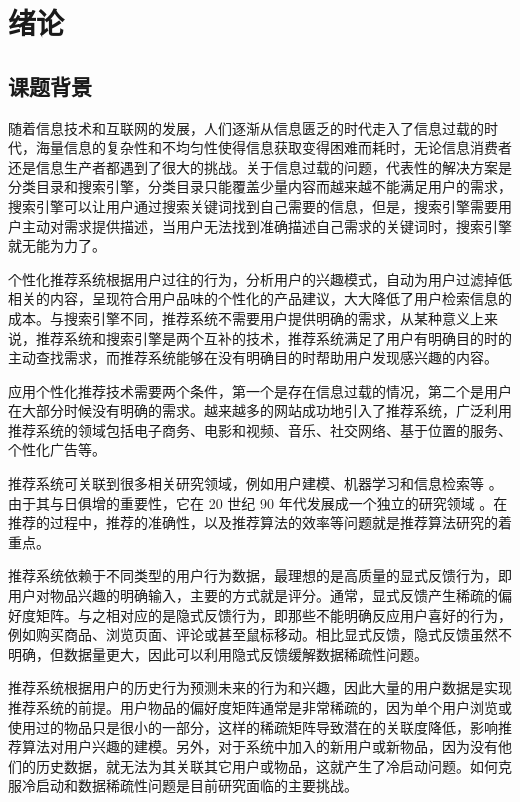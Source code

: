 \chapter{绪论}

\section{课题背景}

随着信息技术和互联网的发展，人们逐渐从信息匮乏的时代走入了信息过载的时代，海量信息的复杂性和不均匀性使得信息获取变得困难而耗时，无论信息消费者还是信息生产者都遇到了很大的挑战。关于信息过载的问题，代表性的解决方案是分类目录和搜索引擎\cite{项亮2012推荐系统实践}，分类目录只能覆盖少量内容而越来越不能满足用户的需求，搜索引擎可以让用户通过搜索关键词找到自己需要的信息，但是，搜索引擎需要用户主动对需求提供描述，当用户无法找到准确描述自己需求的关键词时，搜索引擎就无能为力了。

个性化推荐系统根据用户过往的行为，分析用户的兴趣模式，自动为用户过滤掉低相关的内容，呈现符合用户品味的个性化的产品建议，大大降低了用户检索信息的成本。与搜索引擎不同，推荐系统不需要用户提供明确的需求，从某种意义上来说，推荐系统和搜索引擎是两个互补的技术，推荐系统满足了用户有明确目的时的主动查找需求，而推荐系统能够在没有明确目的时帮助用户发现感兴趣的内容。

应用个性化推荐技术需要两个条件，第一个是存在信息过载的情况，第二个是用户在大部分时候没有明确的需求。越来越多的网站成功地引入了推荐系统，广泛利用推荐系统的领域包括电子商务、电影和视频、音乐、社交网络、基于位置的服务、个性化广告等。

推荐系统可关联到很多相关研究领域，例如用户建模、机器学习和信息检索等 \cite{fernandez2012cross} 。由于其与日俱增的重要性，它在 20 世纪 90 年代发展成一个独立的研究领域 \cite{肖力涛2016基于隐式因子和隐式主题的跨域推荐算法研究}。在推荐的过程中，推荐的准确性，以及推荐算法的效率等问题就是推荐算法研究的着重点。

推荐系统依赖于不同类型的用户行为数据，最理想的是高质量的显式反馈行为，即用户对物品兴趣的明确输入，主要的方式就是评分。通常，显式反馈产生稀疏的偏好度矩阵。与之相对应的是隐式反馈行为，即那些不能明确反应用户喜好的行为，例如购买商品、浏览页面、评论或甚至鼠标移动。相比显式反馈，隐式反馈虽然不明确，但数据量更大，因此可以利用隐式反馈缓解数据稀疏性问题。

推荐系统根据用户的历史行为预测未来的行为和兴趣，因此大量的用户数据是实现推荐系统的前提。用户物品的偏好度矩阵通常是非常稀疏的，因为单个用户浏览或使用过的物品只是很小的一部分，这样的稀疏矩阵导致潜在的关联度降低，影响推荐算法对用户兴趣的建模。另外，对于系统中加入的新用户或新物品，因为没有他们的历史数据，就无法为其关联其它用户或物品，这就产生了冷启动问题。如何克服冷启动和数据稀疏性问题是目前研究面临的主要挑战。


